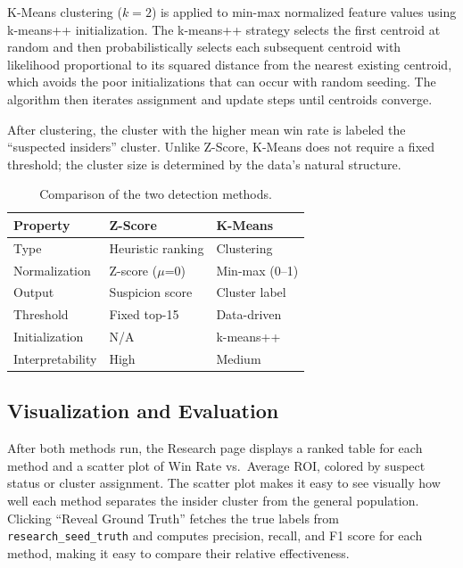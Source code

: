 \documentclass[sigconf,nonacm]{acmart}
\begin{document}
K-Means clustering ($k=2$) is applied to min-max normalized feature
values using k-means++ initialization. The k-means++ strategy selects
the first centroid at random and then probabilistically selects each
subsequent centroid with likelihood proportional to its squared
distance from the nearest existing centroid, which avoids the poor
initializations that can occur with random seeding. The algorithm then
iterates assignment and update steps until centroids converge.

After clustering, the cluster with the higher mean win rate is labeled
the ``suspected insiders'' cluster. Unlike Z-Score, K-Means does not
require a fixed threshold; the cluster size is determined by the
data's natural structure.

\begin{table}[h]
  \caption{Comparison of the two detection methods.}
  \label{tab:methods}
  \renewcommand{\arraystretch}{1.2}
  \begin{tabular}{|l|l|l|}
    \hline
    \textbf{Property} & \textbf{Z-Score} & \textbf{K-Means} \\
    \hline
    Type              & Heuristic ranking & Clustering \\
    Normalization     & Z-score ($\mu$=0) & Min-max (0--1) \\
    Output            & Suspicion score   & Cluster label \\
    Threshold         & Fixed top-15      & Data-driven \\
    Initialization    & N/A               & k-means++ \\
    Interpretability  & High              & Medium \\
    \hline
  \end{tabular}
\end{table}

\subsection{Visualization and Evaluation}

After both methods run, the Research page displays a ranked table for
each method and a scatter plot of Win Rate vs.\ Average ROI, colored
by suspect status or cluster assignment. The scatter plot makes it
easy to see visually how well each method separates the insider cluster
from the general population. Clicking ``Reveal Ground Truth'' fetches
the true labels from \texttt{research\_seed\_truth} and computes
precision, recall, and F1 score for each method, making it easy to
compare their relative effectiveness.
\end{document}
